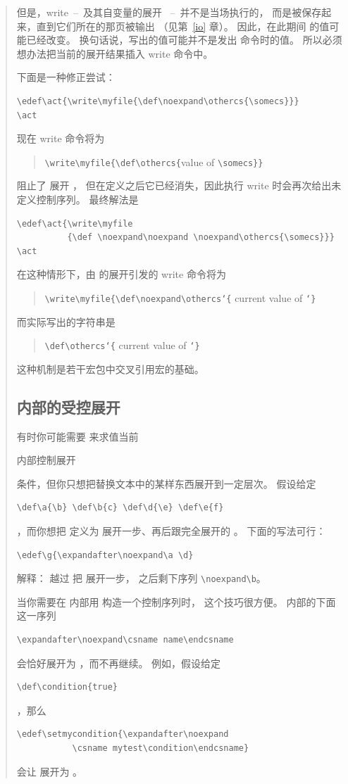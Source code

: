 \documentclass[a4paper]{rapport3}
\def\lb{{\tt\char`\{}}\def\rb{{\tt\char`\}}}
\def\ldash{\unskip\ --\nobreak\ \ignorespaces}
\def\rdash{\unskip\nobreak\ --\ \ignorespaces}
\newenvironment{disp}{\begin{quotation}}{\end{quotation}}
\def\howto#1\par{}
\begin{document}
\begin{disp}
但是，write\ldash 及其自变量的展开 \rdash 并不是当场执行的，
而是被保存起来，直到它们所在的那页被输出
（见第~\ref{io} 章）。
因此，在此期间  的值可能已经改变。
换句话说，写出的值可能并不是发出  命令时的值。
所以必须想办法把当前的展开结果插入 write 命令中。

下面是一种修正尝试：
\begin{verbatim}
\edef\act{\write\myfile{\def\noexpand\othercs{\somecs}}}
\act
\end{verbatim} 
现在 write 命令将为
\begin{disp}\verb>\write\myfile{\def\othercs{>\italic value of\/
     \verb>\somecs}}>\end{disp}
 阻止了  展开 ，
但在定义之后它已经消失，因此执行 write 时会再次给出未定义控制序列。
最终解法是
\begin{verbatim}
\edef\act{\write\myfile
          {\def \noexpand\noexpand \noexpand\othercs{\somecs}}}
\act
\end{verbatim} 
在这种情形下，由  的展开引发的 write 命令将为
\begin{disp}\verb>\write\myfile{\def\noexpand\othercs>\lb
     {\italic current value of }\rb\end{disp}
而实际写出的字符串是
\begin{disp}\verb>\def\othercs>\lb
     {\italic current value of }\rb\end{disp}
这种机制是若干宏包中交叉引用宏的基础。


\subsection{ 内部的受控展开}

有时你可能需要  来求值当前
\howto 在  内部控制展开\par
条件，但你只想把替换文本中的某样东西展开到一定层次。
假设给定
\begin{verbatim}
\def\a{\b} \def\b{c} \def\d{\e} \def\e{f}
\end{verbatim}
，而你想把  定义为  展开一步、再后跟完全展开的 。
下面的写法可行：
\begin{verbatim}
\edef\g{\expandafter\noexpand\a \d}
\end{verbatim}
解释： 越过  把  展开一步，
之后剩下序列 \verb-\noexpand\b-。

当你需要在  内部用  构造一个控制序列时，
这个技巧很方便。 内部的下面这一序列
\begin{verbatim}
\expandafter\noexpand\csname name\endcsname
\end{verbatim}
会恰好展开为 ，而不再继续。
例如，假设给定
\begin{verbatim}
\def\condition{true}
\end{verbatim}
，那么
\begin{verbatim}
\edef\setmycondition{\expandafter\noexpand
           \csname mytest\condition\endcsname}
\end{verbatim}
会让  展开为 。


\end{disp}
\end{document}
